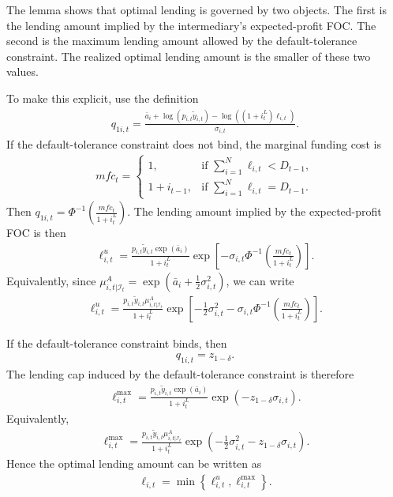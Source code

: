 \documentclass[12pt]{article}
\numberwithin{equation}{section}
\begin{document}
\begin{appendix}
The lemma shows that optimal lending is governed by two objects. The first is the lending amount implied by the intermediary's expected-profit FOC. The second is the maximum lending amount allowed by the default-tolerance constraint. The realized optimal lending amount is the smaller of these two values.

To make this explicit, use the definition
\begin{align*}
    q_{1i,t}
    =
    \frac{
    \bar a_i+\log(p_{i,t}\tilde y_{i,t})
    -
    \log\left((1+i^L_t)\ell_{i,t}\right)
    }
    {\sigma_{i,t}}.
\end{align*}
If the default-tolerance constraint does not bind, the marginal funding cost is
\begin{align*}
    {mfc}_t
    =
    \left\{
    \begin{array}{ll}
        1,
        & \text{if } \sum_{i=1}^N\ell_{i,t}<D_{t-1}, \\[0.8em]
        1+i_{t-1},
        & \text{if } \sum_{i=1}^N\ell_{i,t}=D_{t-1}.
    \end{array}
    \right.
\end{align*}
Then $q_{1i,t} = \Phi^{-1}\left(\frac{{mfc}_t}{1+i^L_t}\right)$.
The lending amount implied by the expected-profit FOC is then
\begin{align*}
    \ell^u_{i,t}
    =
    \frac{
    p_{i,t}\tilde y_{i,t}\exp(\bar a_i)
    }
    {1+i^L_t}
    \exp\left[
    -
    \sigma_{i,t}
    \Phi^{-1}
    \left(
    \frac{{mfc}_t}{1+i^L_t}
    \right)
    \right].
\end{align*}
Equivalently, since $\mu^A_{i, t|\mathcal{I}_t} = \exp\left(\bar a_i+\frac{1}{2}\sigma^2_{i,t}\right)$, we can write
\begin{align*}
    \ell^u_{i,t}
    =
    \frac{
    p_{i,t}\tilde y_{i,t}\mu^A_{i, t|\mathcal{I}_t}
    }
    {1+i^L_t}
    \exp\left[
    -
    \frac{1}{2}\sigma^2_{i,t}
    -
    \sigma_{i,t}
    \Phi^{-1}
    \left(
    \frac{{mfc}_t}{1+i^L_t}
    \right)
    \right].
\end{align*}

If the default-tolerance constraint binds, then
\begin{align*}
    q_{1i,t}
    =
    z_{1-\delta}.
\end{align*}
The lending cap induced by the default-tolerance constraint is therefore
\begin{align*}
    \ell^{\max}_{i,t}
    =
    \frac{
    p_{i,t}\tilde y_{i,t}\exp(\bar a_i)
    }
    {1+i^L_t}
    \exp\left(
    -z_{1-\delta}\sigma_{i,t}
    \right).
\end{align*}
Equivalently,
\begin{align*}
    \ell^{\max}_{i,t}
    =
    \frac{
    p_{i,t}\tilde y_{i,t}\mu^A_{i, t|\mathcal{I}_t}
    }
    {1+i^L_t}
    \exp\left(
    -\frac{1}{2}\sigma^2_{i,t}
    -
    z_{1-\delta}\sigma_{i,t}
    \right).
\end{align*}
Hence the optimal lending amount can be written as
\begin{align*}
    \ell_{i,t}
    =
    \min
    \left\{
    \ell^u_{i,t},
    \ell^{\max}_{i,t}
    \right\}.
\end{align*}


\end{appendix}
\end{document}
